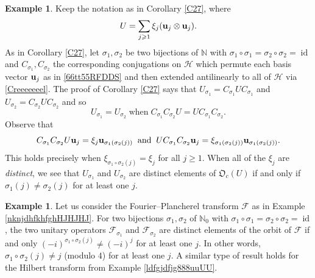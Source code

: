 \documentclass{dis}
\theoremstyle{plain}
\theoremstyle{definition}
\newtheorem{Example}[equation]{Example}
\def\N{\mathbb{N}}
\renewcommand{\geq}{\geqslant}
\renewcommand{\vec}[1]{{\bf #1}}
\newcommand{\0}{{\color{lightgray}0}}
\begin{document}
\begin{Example}\label{lksjnfkdghdu88y8Y*YYYY}
Keep the notation as in  Corollary \ref{C27}, where 
$$U = \sum_{j \geq 1} \xi_j (\vec{u}_j \otimes \vec{u}_j).$$
 As in Corollary \ref{C27}, let $\sigma_1, \sigma _2$ be two bijections of $\N$ with $\sigma_{1} \circ \sigma_{1} =  \sigma_2 \circ \sigma_2 = \operatorname{id}$ and $C_{\sigma_1}, C_{\sigma_2}$ the corresponding conjugations on $\mathcal{H}$ which permute each basis vector $\vec{u}_j$ as in \eqref{66tt55RFDDS} and then extended antilinearly to all of $\mathcal{H}$ via \eqref{Creeeeeeel}. The proof of Corollary \ref{C27} says that 
 $U_{\sigma_1} = C_{\sigma_1} U C_{\sigma_1}$ and $U_{\sigma_2} = C_{\sigma_2} U C_{\sigma_2}$ and so $$U_{\sigma_1} = U_{\sigma_2} \; \mbox{when} \; C_{\sigma_1} C_{\sigma_2} U = U C_{\sigma_1} C_{\sigma_2}.$$ Observe that 
 $$C_{\sigma_1} C_{\sigma_2} U \vec{u}_j = \xi_{j} \vec{u}_{\sigma_1 (\sigma_2(j))} \; \; \mbox{and} \; \; 
 U C_{\sigma_1} C_{\sigma_2} \vec{u}_j = \xi_{\sigma_1(\sigma_{2}(j))}  \vec{u}_{\sigma_1 (\sigma_2(j))}.$$
 This holds precisely when 
 $\xi_{\sigma_1 \circ \sigma_2 (j)} = \xi_{j}$ for all $j \geq 1$. When  all of the $\xi_j$ are {\em distinct}, we see that $U_{\sigma_1}$ and $U_{\sigma_2}$ are distinct elements of $\mathfrak{O}_c(U)$ if and only if $\sigma_{1}(j) \not = \sigma_{2}(j)$ for at least one $j$.
\end{Example}

\begin{Example}
Let us consider the Fourier--Plancherel transform $\mathcal{F}$ as in Example \ref{nknjdhfkhfghHJHJHJ}. For two bijections $\sigma_1, \sigma _2$  of $\N_0$ with $\sigma_{1} \circ \sigma_1 = \sigma_{2} \circ \sigma_{2} = \operatorname{id}$, the two unitary operators
$\mathcal{F}_{\sigma_1}$  and  $\mathcal{F}_{\sigma_2}$ are distinct elements of the orbit of $\mathcal{F}$ if and only
$(-i)^{\sigma_1 \circ \sigma_2(j)} \not = (-i)^j$ for at least one $j$. In other words, $\sigma_1 \circ \sigma_2(j) \not = j$ (modulo $4$) for at least one $j$. A similar type of result holds for the Hilbert transform from Example \ref{ldfgjdfjg888uuUU}.
\end{Example}
\end{document}
